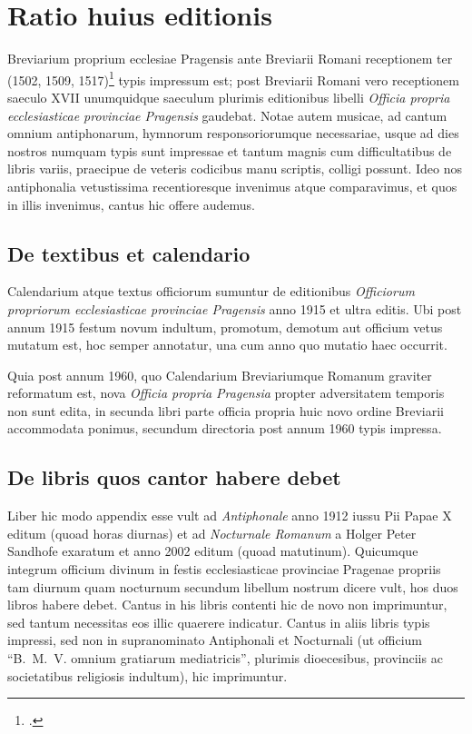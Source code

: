 \chapter*{Ratio huius editionis}

Breviarium proprium ecclesiae Pragensis
ante Breviarii Romani receptionem ter
(1502, 1509, 1517)\footcite[242]{bohatta}
typis impressum est; post Breviarii Romani vero receptionem
saeculo XVII unumquidque saeculum plurimis editionibus
libelli \emph{Officia propria ecclesiasticae provinciae Pragensis} gaudebat.
Notae autem musicae, ad cantum omnium antiphonarum, hymnorum
responsoriorumque necessariae,
usque ad dies nostros numquam typis sunt impressae
et tantum magnis cum difficultatibus de libris variis,
praecipue de veteris codicibus manu scriptis,
colligi possunt. Ideo nos antiphonalia vetustissima recentioresque
invenimus atque comparavimus, et quos in illis invenimus,
cantus hic offere audemus.

\section*{De textibus et calendario}
Calendarium atque textus officiorum sumuntur de editionibus
\emph{Officiorum propriorum ecclesiasticae provinciae Pragensis}
anno 1915 et ultra editis. %
Ubi post annum 1915 festum novum indultum, promotum, demotum
aut officium vetus mutatum est, hoc semper annotatur,
una cum anno quo mutatio haec occurrit.

Quia post annum 1960, quo Calendarium Breviariumque Romanum
graviter reformatum est, nova \emph{Officia propria Pragensia}
propter adversitatem temporis non sunt edita,
in secunda libri parte officia propria huic novo ordine Breviarii
accommodata ponimus, secundum directoria post annum 1960 typis
impressa.

\section*{De libris quos cantor habere debet}
Liber hic modo appendix esse vult ad \emph{Antiphonale}
anno 1912 iussu Pii Papae X editum (quoad horas diurnas) et
ad \emph{Nocturnale Romanum} a Holger Peter Sandhofe exaratum
et anno 2002 editum (quoad matutinum).
Quicumque integrum officium divinum in festis ecclesiasticae provinciae
Pragenae propriis tam diurnum quam nocturnum secundum
libellum nostrum dicere vult, hos duos libros habere debet.
Cantus in his libris contenti hic de novo non imprimuntur,
sed tantum necessitas eos illic quaerere indicatur.
Cantus in aliis libris typis impressi, sed non in supranominato
Antiphonali et Nocturnali (ut officium
\enquote{B.~M.~V. omnium gratiarum mediatricis}, plurimis dioecesibus,
provinciis ac societatibus religiosis indultum), hic imprimuntur.

